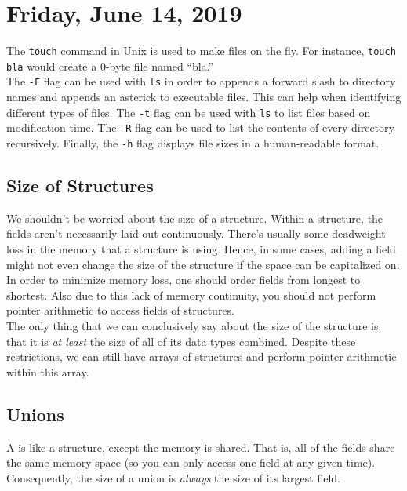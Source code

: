 \section{Friday, June 14, 2019}

The \verb!touch! command in Unix is used to make files on the fly. For instance, \texttt{touch bla} would create a $0$-byte file named ``bla.'' \\

The \verb!-F! flag can be used with \verb!ls! in order to appends a forward slash to directory names and appends an asterick to executable files. This can help when identifying different types of files. The \verb!-t! flag can be used with \verb!ls! to list files based on modification time. The \verb!-R! flag can be used to list the contents of every directory recursively. Finally, the \verb!-h! flag displays file sizes in a human-readable format. \\

\subsection{Size of Structures}

We shouldn't be worried about the size of a structure. Within a structure, the fields aren't necessarily laid out continuously. There's usually some deadweight loss in the memory that a structure is using. Hence, in some cases, adding a field might not even change the size of the structure if the space can be capitalized on. In order to minimize memory loss, one should order fields from longest to shortest. Also due to this lack of memory continuity, you should not perform pointer arithmetic to access fields of structures. \\


The only thing that we can conclusively say about the size of the structure is that it is \textit{at least} the size of all of its data types combined. Despite these restrictions, we can still have arrays of structures and perform pointer arithmetic within this array.

\subsection{Unions}

A  is like a structure, except the memory is shared. That is, all of the fields share the same memory space (so you can only access one field at any given time). Consequently, the size of a union is \textit{always} the size of its largest field. 

